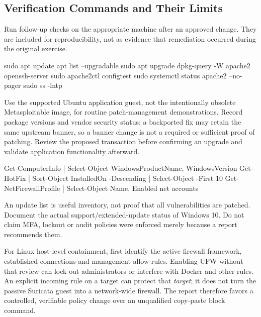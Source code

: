 \documentclass[11pt,a4paper]{article}
\begin{document}
\subsection{Verification Commands and Their Limits}
Run follow-up checks on the appropriate machine after an approved change. They are included for reproducibility, not as evidence that remediation occurred during the original exercise.
\begin{cmdbox}
\begin{reportcode}
sudo apt update
apt list --upgradable
sudo apt upgrade
dpkg-query -W apache2 openssh-server
sudo apache2ctl configtest
sudo systemctl status apache2 --no-pager
sudo ss -lntp
\end{reportcode}
\end{cmdbox}
Use the supported Ubuntu application guest, not the intentionally obsolete Metasploitable image, for routine patch-management demonstrations. Record package versions and vendor security status; a backported fix may retain the same upstream banner, so a banner change is not a required or sufficient proof of patching. Review the proposed transaction before confirming an upgrade and validate application functionality afterward.

\begin{cmdbox}
\begin{reportcode}
Get-ComputerInfo | Select-Object WindowsProductName, WindowsVersion
Get-HotFix | Sort-Object InstalledOn -Descending | Select-Object -First 10
Get-NetFirewallProfile | Select-Object Name, Enabled
net accounts
\end{reportcode}
\end{cmdbox}
An update list is useful inventory, not proof that all vulnerabilities are patched. Document the actual support/extended-update status of Windows 10. Do not claim MFA, lockout or audit policies were enforced merely because a report recommends them.

For Linux host-level containment, first identify the active firewall framework, established connections and management allow rules. Enabling UFW without that review can lock out administrators or interfere with Docker and other rules. An explicit incoming rule on a target can protect that \emph{target}; it does not turn the passive Suricata guest into a network-wide firewall. The report therefore favors a controlled, verifiable policy change over an unqualified copy-paste block command.
\end{document}
